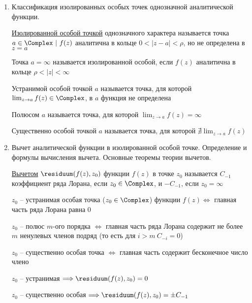 \begin{enumerate}
    \item Классификация изолированных особых точек однозначной аналитической функции.

    \Defs \hyperlink{isolated_special_point}{Изолированной особой точкой} однозначного характера называется точка $a \in \Complex \ | \ f(z)$ аналитична в кольце $0 < |z - a| < \rho$, но не определена в $z = a$

    \Defs Точка $a = \infty$ называется изолированной особой, если $f(z)$ аналитична в кольце $\rho < |z| < \infty$

    \Defs Устранимой особой точкой $a$ называется точка, для которой $\lim_{z \to a} f(z) \in \Complex$, в $a$ функция не определена

    Полюсом $a$ называется точка, для которой $\lim_{z \to a} f(z) = \infty$

    Существенно особой точкой $a$ называется точка, для которой $\nexists \lim_{z \to a} f(z)$

    \item Вычет аналитической функции в изолированной особой точке. Определение и формулы вычисления вычета. Основные теоремы теории вычетов.

    \Defs \hyperlink{residuum}{Вычетом} $\residuum(f(z), z_0)$ функции $f(z)$ в точке $z_0$ называется $C_{-1}$ коэффициент ряда Лорана, если $z_0 \in \Complex$, и $-C_{-1}$, если $z_0 = \infty$

    \begin{MyTheorem}
         $z_0$ -- устранимая особая точка ($z_0 \in \Complex$) функции $f(z) \Longleftrightarrow$ главная часть ряда Лорана равна 0
    \end{MyTheorem}
    
    \begin{MyTheorem}
         $z_0$ -- полюс $m$-ого порядка $\Longleftrightarrow$ главная часть ряда Лорана содержит не более $m$ ненулевых членов подряд (то есть для $i > m \ C_{-i} = 0$) 
    \end{MyTheorem}

    \begin{MyTheorem}
         $z_0$ -- существенно особая точка $\Longleftrightarrow$ главная часть содержит бесконечное число члено
    \end{MyTheorem}

    \Notas $z_0$ -- устранимая $\Longrightarrow \residuum(f(z), z_0) = 0$
    
    $z_0$ -- существенно особая $\Longrightarrow \residuum(f(z), z_0) = \pm C_{-1}$
    

\end{enumerate}
